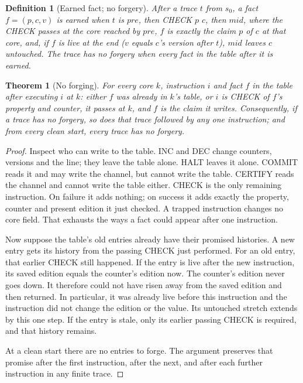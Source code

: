 \documentclass[11pt,twoside]{article}
\theoremstyle{thielethm}
\newtheorem{theorem}{Theorem}[section]
\theoremstyle{thieledef}
\newtheorem{definition}{Definition}[section]
\theoremstyle{thieledef}
\theoremstyle{thieledef}
\theoremstyle{thielethm}
\theoremstyle{thieleobs}
\theoremstyle{thielethm}
\begin{document}
\begin{definition}[Earned fact; no forgery]\label{def:u34-earned}
After a trace $t$ from $s_0$, a fact $f = (p, c, v)$ is \emph{earned} when $t$ is $\mathit{pre}$,
then CHECK $p$ $c$, then $\mathit{mid}$, where the CHECK passes at the core reached by
$\mathit{pre}$, $f$ is exactly the claim $p$ of $c$ at that core, and, if $f$ is live at the
end ($v$ equals $c$'s version after $t$), $\mathit{mid}$ leaves $c$ untouched. The trace has
\emph{no forgery} when every fact in the table after it is earned.
\end{definition}

\begin{theorem}[No forging]\label{thm:u34-no-forging}
For every core $k$, instruction $i$ and fact $f$ in the table after executing $i$ at $k$:
either $f$ was already in $k$'s table, or $i$ is CHECK of $f$'s property and counter, it
passes at $k$, and $f$ is the claim it writes. Consequently, if a trace has no forgery, so
does that trace followed by any one instruction; and from every clean start, every trace
has no forgery.
\end{theorem}

\begin{proof}
Inspect who can write to the table. INC and DEC change counters, versions
and the line; they leave the table alone. HALT leaves it alone. COMMIT
reads it and may write the channel, but cannot write the table. CERTIFY
reads the channel and cannot write the table either. CHECK is the only
remaining instruction. On failure it adds nothing; on success it adds
exactly the property, counter and present edition it just checked. A
trapped instruction changes no core field. That exhausts the ways a fact
could appear after one instruction.

Now suppose the table's old entries already have their promised histories.
A new entry gets its history from the passing CHECK just performed. For an
old entry, that earlier CHECK still happened. If the entry is live after
the new instruction, its saved edition equals the counter's edition now.
The counter's edition never goes down. It therefore could not have risen
away from the saved edition and then returned. In particular, it was
already live before this instruction and the instruction did not change
the edition or the value. Its untouched stretch extends by this one step.
If the entry is stale, only its earlier passing CHECK is required, and
that history remains.

At a clean start there are no entries to forge. The argument preserves
that promise after the first instruction, after the next, and after each
further instruction in any finite trace.
\end{proof}
\end{document}
